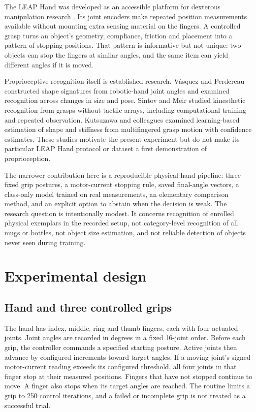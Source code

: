 \documentclass[12pt,a4paper]{article}
\begin{document}
The LEAP Hand was developed as an accessible platform for dexterous manipulation research \cite{shaw2023}. Its joint encoders make repeated position measurements available without mounting extra sensing material on the fingers. A controlled grasp turns an object's geometry, compliance, friction and placement into a pattern of stopping positions. That pattern is informative but not unique: two objects can stop the fingers at similar angles, and the same item can yield different angles if it is moved.

Proprioceptive recognition itself is established research. V\'asquez and Perdereau \cite{vasquez2017} constructed shape signatures from robotic-hand joint angles and examined recognition across changes in size and pose. Sintov and Meir \cite{sintov2023} studied kinesthetic recognition from grasps without tactile arrays, including computational training and repeated observation. Kutsuzawa and colleagues \cite{kutsuzawa2024} examined learning-based estimation of shape and stiffness from multifingered grasp motion with confidence estimates. These studies motivate the present experiment but do not make its particular LEAP Hand protocol or dataset a first demonstration of proprioception.

The narrower contribution here is a reproducible physical-hand pipeline: three fixed grip postures, a motor-current stopping rule, saved final-angle vectors, a class-only model trained on real measurements, an elementary comparison method, and an explicit option to abstain when the decision is weak. The research question is intentionally modest. It concerns recognition of enrolled physical exemplars in the recorded setup, not category-level recognition of all mugs or bottles, not object size estimation, and not reliable detection of objects never seen during training.

\section{Experimental design}

\subsection{Hand and three controlled grips}

The hand has index, middle, ring and thumb fingers, each with four actuated joints. Joint angles are recorded in degrees in a fixed 16-joint order. Before each grip, the controller commands a specified starting posture. Active joints then advance by configured increments toward target angles. If a moving joint's signed motor-current reading exceeds its configured threshold, all four joints in that finger stop at their measured positions. Fingers that have not stopped continue to move. A finger also stops when its target angles are reached. The routine limits a grip to 250 control iterations, and a failed or incomplete grip is not treated as a successful trial.
\end{document}
